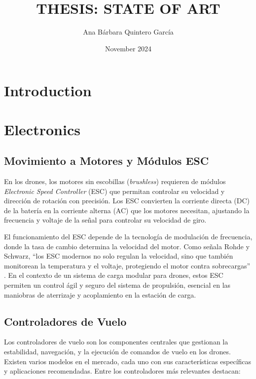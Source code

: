 \documentclass{article}
\title{THESIS: STATE OF ART}
\author{Ana Bárbara Quintero García}
\date{November 2024}
\begin{document}
\maketitle

\section{Introduction}


\section{Electronics}

\subsection{Movimiento a Motores y Módulos ESC}

En los drones, los motores sin escobillas (\textit{brushless}) requieren de módulos \textit{Electronic Speed Controller} (ESC) que permitan controlar su velocidad y dirección de rotación con precisión. Los ESC convierten la corriente directa (DC) de la batería en la corriente alterna (AC) que los motores necesitan, ajustando la frecuencia y voltaje de la señal para controlar su velocidad de giro. 

El funcionamiento del ESC depende de la tecnología de modulación de frecuencia, donde la tasa de cambio determina la velocidad del motor. Como señala Rohde y Schwarz, “los ESC modernos no solo regulan la velocidad, sino que también monitorean la temperatura y el voltaje, protegiendo el motor contra sobrecargas” \cite{rohdE_ESC}. En el contexto de un sistema de carga modular para drones, estos ESC permiten un control ágil y seguro del sistema de propulsión, esencial en las maniobras de aterrizaje y acoplamiento en la estación de carga.

\subsection{Controladores de Vuelo}

Los controladores de vuelo son los componentes centrales que gestionan la estabilidad, navegación, y la ejecución de comandos de vuelo en los drones. Existen varios modelos en el mercado, cada uno con sus características específicas y aplicaciones recomendadas. Entre los controladores más relevantes destacan:
\end{document}
